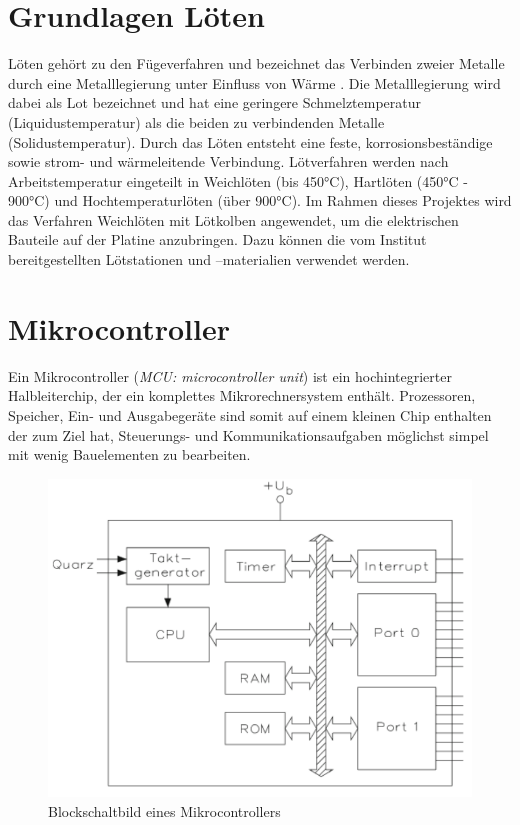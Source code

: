 \section{Grundlagen Löten}
Löten gehört zu den Fügeverfahren und bezeichnet das Verbinden zweier Metalle durch eine Metalllegierung unter Einfluss von Wärme \cite{loeten}. Die Metalllegierung wird dabei als Lot bezeichnet und hat eine geringere Schmelztemperatur (Liquidustemperatur) als die beiden zu verbindenden Metalle (Solidustemperatur). Durch das Löten entsteht eine feste, korrosionsbeständige sowie strom- und wärmeleitende Verbindung. Lötverfahren werden nach Arbeitstemperatur eingeteilt in Weichlöten (bis 450°C), Hartlöten (450°C - 900°C) und Hochtemperaturlöten (über 900°C). Im Rahmen dieses Projektes wird das Verfahren Weichlöten mit Lötkolben angewendet, um die elektrischen Bauteile auf der Platine anzubringen. Dazu können die vom Institut bereitgestellten Lötstationen und –materialien verwendet werden. 

\section{Mikrocontroller}
Ein Mikrocontroller (\textit{MCU: microcontroller unit}) ist ein hochintegrierter Halbleiterchip, der ein komplettes Mikrorechnersystem enthält. Prozessoren, Speicher, Ein- und Ausgabegeräte sind somit auf einem kleinen Chip enthalten der zum Ziel hat, Steuerungs- und Kommunikationsaufgaben möglichst simpel mit wenig Bauelementen zu bearbeiten. 
\begin{figure}[h]
	\centering
		\includegraphics[width=0.55\columnwidth]{Bilder/BlockschaltbildMikrocontroller.pdf}
	\caption{Blockschaltbild eines Mikrocontrollers \cite[S.3]{Bernstein2015}}
	\label{fig:Blockschaltbild Mikrocontroller}
\end{figure} \noindent

